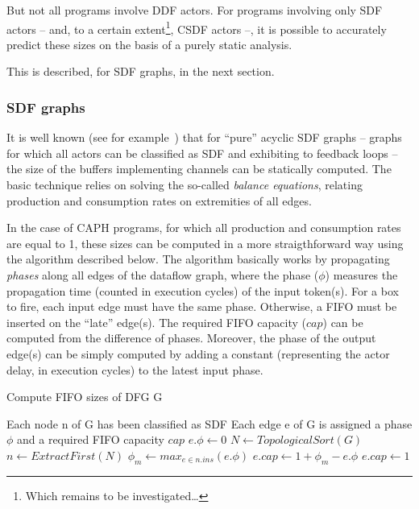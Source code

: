But not all programs involve DDF actors. For programs involving only SDF actors -- and, to a certain
extent\footnote{Which remains to be investigated\ldots}, CSDF actors --, it is possible to
accurately predict these sizes on the basis of a purely static analysis.

This is described, for SDF graphs, in the next section.

\subsubsection{SDF graphs}
\label{sec:sdf-fifo-sizing}

It is well known (see for example~\cite{Parks1995}) that for ``pure'' acyclic SDF graphs -- \ie
graphs for which all actors can be classified as SDF and exhibiting to feedback loops -- the size of
the buffers implementing channels can be statically computed. The basic technique relies on solving
the so-called \emph{balance equations}, relating production and consumption rates on extremities of
all edges.

\medskip In the case of CAPH programs, for which all production and consumption rates are equal to
1, these sizes can be computed in a more straigthforward way using the algorithm described below.
The algorithm basically works by propagating \emph{phases} along all edges of the dataflow graph, where
the phase ($\phi$) measures the propagation time (counted in execution cycles) of the input
token(s).  For a box to fire, each input edge must have the same phase. Otherwise, a FIFO must be
inserted on the ``late'' edge(s). The required FIFO capacity ($cap$) can be computed from the difference of
phases. Moreover, the phase of the output edge(s) can be simply computed by adding a constant
(representing the actor delay, in execution cycles) to the latest input phase.  

\begin{algorithm} \caption{Compute FIFO sizes of DFG G}
\label{alg:phase-prop}
\begin{algorithmic}[1]
\Require Each node n of G has been classified as SDF
\Ensure Each edge e of G is assigned a phase $\phi$ and a required FIFO capacity $cap$
\State $e.\phi \gets 0$
\EndFor
\EndFor
\State $N \gets TopologicalSort(G)$
\State $n \gets ExtractFirst(N)$
\State $\phi_m \gets max_{e \in n.ins}(e.\phi)$
\State $e.cap \gets 1 + \phi_m - e.\phi$
\Else
\State $e.cap \gets 1$
\EndIf
\EndFor
{}
\EndFor
\EndWhile
\end{algorithmic}
\end{algorithm}

